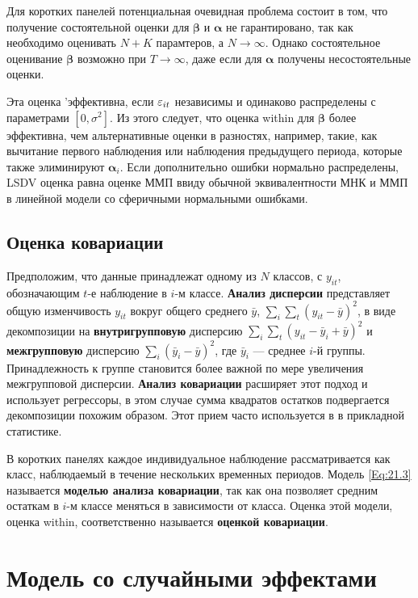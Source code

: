 Для коротких панелей потенциальная очевидная проблема состоит в том, что получение состоятельной оценки для $\bm\beta$ и $\bm\alpha$ не гарантировано, так как необходимо оценивать $N+K$ парамтеров, а $N \rightarrow \infty$. Однако состоятельное оценивание $\bm\beta$  возможно при $T \rightarrow \infty$, даже если для $\bm\alpha$ получены несостоятельные оценки.

Эта оценка 'эффективна, если $\varepsilon_{it}$ независимы и одинаково распределены с параметрами $[0, \sigma^2]$. Из этого следует, что оценка within для $\bm\beta$ более эффективна, чем альтернативные оценки в разностях, например, такие, как вычитание первого наблюдения или наблюдения предыдущего периода, которые также элиминируют $\bm\alpha_i$. Если дополнительно ошибки нормально распределены, LSDV оценка равна оценке ММП ввиду обычной эквивалентности МНК и ММП в линейной модели со сферичными нормальными ошибками.

\subsection{Оценка ковариации}

Предположим, что данные принадлежат одному из $N$ классов, с $y_{it}$, обозначающим $t$-е наблюдение в $i$-м классе. \textbf{Анализ дисперсии} представляет общую изменчивость $y_{it}$ вокруг общего среднего $\bar{y}$, $\sum_i \sum_t (y_{it}-\bar{y})^2$, в виде декомпозиции на \textbf{внутригрупповую} дисперсию $\sum_i \sum_t (y_{it}-\bar{y}_i+\bar{y})^2$ и \textbf{межгрупповую} дисперсию $\sum_i(\bar{y}_i-\bar{y})^2$, где $\bar{y}_i$ --- среднее $i$-й группы. Принадлежность к группе становится более важной по мере увеличения межгрупповой дисперсии. \textbf{Анализ ковариации} расширяет этот подход и использует регрессоры, в этом случае сумма квадратов остатков подвергается декомпозиции похожим образом. Этот прием часто используется в в прикладной статистике.

В коротких панелях каждое индивидуальное наблюдение рассматривается как класс, наблюдаемый в течение нескольких временных периодов. Модель \ref{Eq:21.3} называется \textbf{моделью анализа ковариации}, так как она позволяет средним остаткам в $i$-м классе меняться в зависимости от класса. Оценка этой модели, оценка within, соответственно называется \textbf{оценкой ковариации}.

\section{Модель со случайными эффектами}

